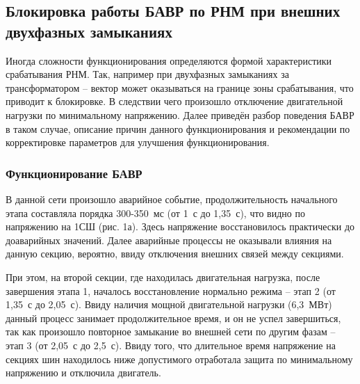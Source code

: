 
\subsection{Блокировка работы БАВР по РНМ при внешних двухфазных замыканиях}
\label{sec:ch1_external_two_phase_blocking}

Иногда сложности функционирования определяются формой характеристики срабатывания РНМ.
Так, например при двухфазных замыканиях за трансформатором -- вектор может оказываться
на границе зоны срабатывания, что приводит к блокировке. В следствии чего произошло
отключение двигательной нагрузки по минимальному напряжению. Далее приведён разбор
поведения БАВР в таком случае, описание причин данного функционирования и рекомендации
по корректировке параметров для улучшения функционирования.

\subsubsection{Функционирование БАВР}

В данной сети произошло аварийное событие, продолжительность начального этапа составляла
порядка 300-350~мс (от 1~с до 1,35~с), что видно по напряжению на 1СШ (рис. 1а). Здесь
напряжение восстановилось практически до доаварийных значений. Далее аварийные процессы
не оказывали влияния на данную секцию, вероятно, ввиду отключения внешних связей между
секциями.

При этом, на второй секции, где находилась двигательная нагрузка, после завершения этапа
1, началось восстановление нормально режима -- этап 2 (от 1,35~с до 2,05~с). Ввиду
наличия мощной двигательной нагрузки (6,3~МВт) данный процесс занимает продолжительное
время, и он не успел завершиться, так как произошло повторное замыкание во внешней сети
по другим фазам -- этап 3 (от 2,05~с до 2,5~с). Ввиду того, что длительное время
напряжение на секциях шин находилось ниже допустимого отработала защита по минимальному
напряжению и отключила двигатель.

